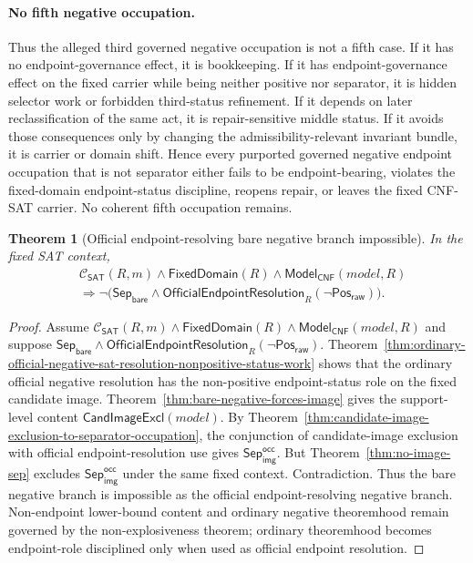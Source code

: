 \documentclass[11pt]{article}
\newtheorem{theorem}{Theorem}[section]
\theoremstyle{definition}
\theoremstyle{remark}
\newcommand{\PosRaw}{\mathsf{Pos}_{\mathsf{raw}}}
\newcommand{\SepBare}{\mathsf{Sep}_{\mathsf{bare}}}
\newcommand{\SepImgOcc}{\mathsf{Sep}_{\mathsf{img}}^{\mathsf{occ}}}
\newcommand{\ClayCtx}{\mathcal{C}_{\mathsf{SAT}}(R,m)}
\newcommand{\FixedDom}{\mathsf{FixedDomain}}
\newcommand{\OfficialEndpointResolution}{\mathsf{OfficialEndpointResolution}}
\newcommand{\ModelOfCnf}{\mathsf{Model}_{\mathsf{CNF}}}
\newcommand{\CandImageExcl}{\mathsf{CandImageExcl}}
\begin{document}
\paragraph{No fifth negative occupation.}
Thus the alleged third governed negative occupation is not a fifth case. If it has no endpoint-governance effect, it is bookkeeping. If it has endpoint-governance effect on the fixed carrier while being neither positive nor separator, it is hidden selector work or forbidden third-status refinement. If it depends on later reclassification of the same act, it is repair-sensitive middle status. If it avoids those consequences only by changing the admissibility-relevant invariant bundle, it is carrier or domain shift. Hence every purported governed negative endpoint occupation that is not separator either fails to be endpoint-bearing, violates the fixed-domain endpoint-status discipline, reopens repair, or leaves the fixed CNF-SAT carrier. No coherent fifth occupation remains.

\begin{theorem}[Official endpoint-resolving bare negative branch impossible]\label{thm:no-bare-sep}
In the fixed SAT context,
\[
\begin{aligned}
  &\ClayCtx\wedge\FixedDom(R)\wedge\ModelOfCnf(model,R)\\
  &\Rightarrow \neg\bigl(\SepBare\wedge\OfficialEndpointResolution_R(\neg\PosRaw)\bigr).
\end{aligned}
\]
\end{theorem}

\begin{proof}
Assume \(\ClayCtx\wedge\FixedDom(R)\wedge\ModelOfCnf(model,R)\) and suppose \(\SepBare\wedge\OfficialEndpointResolution_R(\neg\PosRaw)\). Theorem~\ref{thm:ordinary-official-negative-sat-resolution-nonpositive-status-work} shows that the ordinary official negative resolution has the non-positive endpoint-status role on the fixed candidate image. Theorem~\ref{thm:bare-negative-forces-image} gives the support-level content \(\CandImageExcl(model)\). By Theorem~\ref{thm:candidate-image-exclusion-to-separator-occupation}, the conjunction of candidate-image exclusion with official endpoint-resolution use gives \(\SepImgOcc\). But Theorem~\ref{thm:no-image-sep} excludes \(\SepImgOcc\) under the same fixed context. Contradiction. Thus the bare negative branch is impossible as the official endpoint-resolving negative branch. Non-endpoint lower-bound content and ordinary negative theoremhood remain governed by the non-explosiveness theorem; ordinary theoremhood becomes endpoint-role disciplined only when used as official endpoint resolution.
\end{proof}
\end{document}
